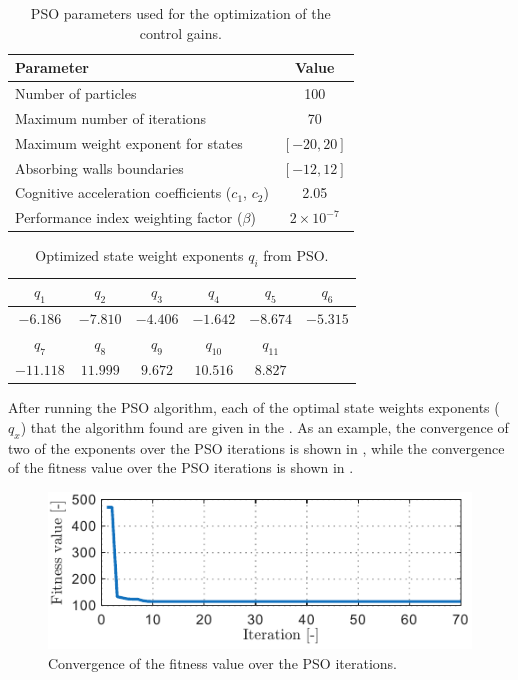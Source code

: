 \begin{table}[t!]
    \centering
    \caption{PSO parameters used for the optimization of the control gains.}
    \label{tab:PSO_Parameters}
    \begin{tabular}{|l|c|}
        \hline
        \textbf{Parameter} & \textbf{Value}\\
        \hline\hline
        Number of particles & 100\\
        Maximum number of iterations & 70\\
        Maximum weight exponent for states & $[-20, 20]$\\
        Absorbing walls boundaries & $[-12, 12]$\\
        Cognitive acceleration coefficients ($c_1$, $c_2$) & 2.05\\
        Performance index weighting factor ($\beta$) & $2\times10^{-7}$\\
        \hline
    \end{tabular}
\end{table}

\begin{table}[h!]
    \centering
    \caption{Optimized state weight exponents $q_i$ from PSO.}
    \label{tab:PSO_Weights}
    \begin{tabular}{|c|c|c|c|c|c|}
        \hline
        $q_1$ & $q_2$ & $q_3$ & $q_4$ & $q_5$ & $q_6$\\
        \hline
        $-6.186$ & $-7.810$ & $-4.406$ & $-1.642$ & $-8.674$ & $-5.315$\\
        \hline
        $q_7$ & $q_8$ & $q_9$ & $q_{10}$ & $q_{11}$ &\\
        \hline
        $-11.118$ & $11.999$ & $9.672$ & $10.516$ & $8.827$ & \\
        \hline
    \end{tabular}
\end{table}

After running the PSO algorithm, each of the optimal state weights exponents ($q_x$) that the algorithm found are given in the . As an example, the convergence of two of the exponents over the PSO iterations is shown in , while the convergence of the fitness value over the PSO iterations is shown in .


\begin{figure}[t!]
    \centering
    \includegraphics[]{Images/Fitness_iterations.pdf}
    \caption{Convergence of the fitness value over the PSO iterations.}
    \label{fig:PSO_Fitness}
\end{figure}

